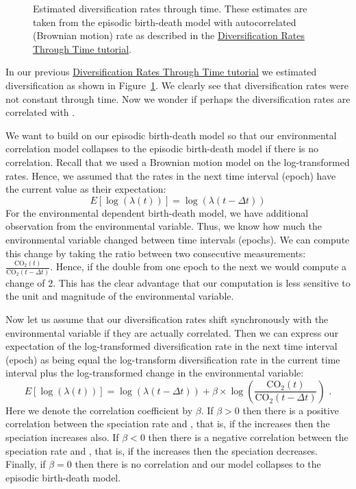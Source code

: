 \begin{figure}[h!]
\centering
{}
\caption{\small Estimated diversification rates through time. These estimates are taken from the episodic birth-death model with autocorrelated (Brownian motion) rate as described in the \href{https://github.com/revbayes/revbayes_tutorial/raw/master/tutorial_TeX/RB_DiversificationRate_Episodic_Tutorial/RB_DiversificationRate_Episodic_Tutorial.pdf}{Diversification Rates Through Time tutorial}.}
\label{fig:EBD_estimates}
\end{figure}
In our previous \href{https://github.com/revbayes/revbayes_tutorial/raw/master/tutorial_TeX/RB_DiversificationRate_Episodic_Tutorial/RB_DiversificationRate_Episodic_Tutorial.pdf}{Diversification Rates Through Time tutorial} we estimated diversification as shown in Figure~\ref{fig:EBD_estimates}.
We clearly see that diversification rates were not constant through time.
Now we wonder if perhaps the diversification rates are correlated with \COO.

We want to build on our episodic birth-death model so that our environmental correlation model collapses to the episodic birth-death model if there is no correlation.
Recall that we used a Brownian motion model on the log-transformed rates.
Hence, we assumed that the rates in the next time interval (epoch) have the current value as their expectation:
\begin{equation}
E[\log( \lambda(t) )] = \log( \lambda(t-\Delta t) )
\end{equation}
For the environmental dependent birth-death model, we have additional observation from the environmental variable.
Thus, we know how much the environmental variable changed between time intervals (epochs).
We can compute this change by taking the ratio between two consecutive measurements: $\frac{\text{CO}_2(t)}{\text{CO}_2(t-\Delta t)}$.
Hence, if the \COO double from one epoch to the next we would compute a change of 2.
This has the clear advantage that our computation is less sensitive to the unit and magnitude of the environmental variable.

Now let us assume that our diversification rates shift synchronously with the environmental variable if they are actually correlated.
Then we can express our expectation of the log-transformed diversification rate in the next time interval (epoch) as being equal the log-transform diversification rate in the current time interval plus the log-transformed change in the environmental variable:
\begin{equation}
E[\log( \lambda(t) )] = \log( \lambda(t-\Delta t) ) + \beta \times \log\left( \frac{\text{CO}_2(t)}{\text{CO}_2(t-\Delta t)} \right) \mbox{ .}
\end{equation}
Here we denote the correlation coefficient by $\beta$.
If $\beta > 0$ then there is a positive correlation between the speciation rate and \COO, that is, if the \COO increases then the speciation increases also.
If $\beta < 0$ then there is a negative correlation between the speciation rate and \COO, that is, if the \COO increases then the speciation decreases.
Finally, if $\beta = 0$ then there is no correlation and our model collapses to the episodic birth-death model.

